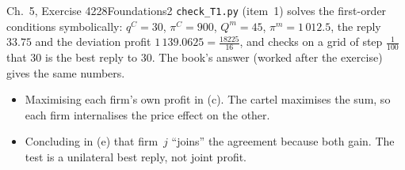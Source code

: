 \begin{exsol}{\MG{} Ch.~5, Exercise 4}{228}{Foundations}{2}
\verify \texttt{check\_T1.py} (item~1) solves the first-order conditions symbolically: $q^C = 30$,
$\pi^C = 900$, $Q^m = 45$, $\pi^m = 1\,012.5$, the reply $33.75$ and the deviation profit
$1\,139.0625 = \frac{18225}{16}$, and checks on a grid of step $\frac1{100}$ that $30$ is the best reply to
$30$. The book's answer (worked after the exercise) gives the same numbers.

\mistakes
\begin{itemize}
  \item Maximising each firm's own profit in (c). The cartel maximises the sum, so each firm
  internalises the price effect on the other.
  \item Concluding in (e) that firm~$j$ ``joins'' the agreement because both gain. The test is a
  unilateral best reply, not joint profit.
\end{itemize}

\end{exsol}
